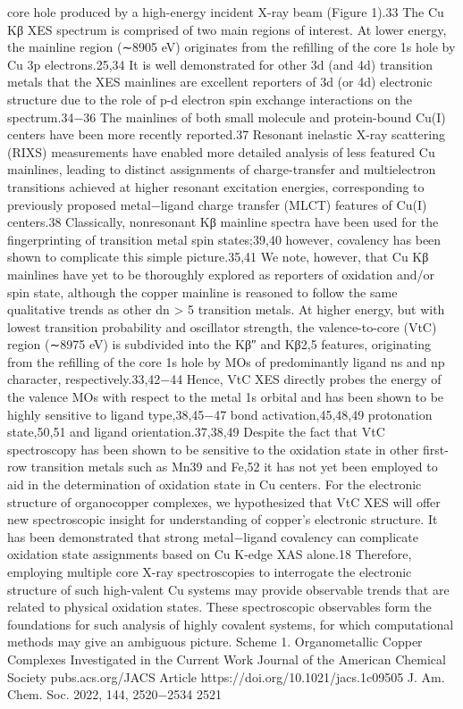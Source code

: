 \documentclass{article}
\begin{document}
core hole produced by a high-energy incident X-ray beam
(Figure 1).33 The Cu Kβ XES spectrum is comprised of two
main regions of interest. At lower energy, the mainline region
(∼8905 eV) originates from the reﬁlling of the core 1s hole by
Cu 3p electrons.25,34 It is well demonstrated for other 3d (and
4d) transition metals that the XES mainlines are excellent
reporters of 3d (or 4d) electronic structure due to the role of
p-d electron spin exchange interactions on the spectrum.34−36
The mainlines of both small molecule and protein-bound
Cu(I) centers have been more recently reported.37 Resonant
inelastic X-ray scattering (RIXS) measurements have enabled
more detailed analysis of less featured Cu mainlines, leading to
distinct assignments of charge-transfer and multielectron
transitions achieved at higher resonant excitation energies,
corresponding to previously proposed metal−ligand charge
transfer (MLCT) features of Cu(I) centers.38 Classically,
nonresonant Kβ mainline spectra have been used for the
ﬁngerprinting of transition metal spin states;39,40 however,
covalency has been shown to complicate this simple
picture.35,41 We note, however, that Cu Kβ mainlines have
yet to be thoroughly explored as reporters of oxidation and/or
spin state, although the copper mainline is reasoned to follow
the same qualitative trends as other dn > 5 transition metals.
At higher energy, but with lowest transition probability and
oscillator strength, the valence-to-core (VtC) region (∼8975
eV) is subdivided into the Kβ″ and Kβ2,5 features, originating
from the reﬁlling of the core 1s hole by MOs of predominantly
ligand ns and np character, respectively.33,42−44 Hence, VtC
XES directly probes the energy of the valence MOs with
respect to the metal 1s orbital and has been shown to be highly
sensitive to ligand type,38,45−47 bond activation,45,48,49
protonation state,50,51 and ligand orientation.37,38,49 Despite
the fact that VtC spectroscopy has been shown to be sensitive
to the oxidation state in other ﬁrst-row transition metals such
as Mn39 and Fe,52 it has not yet been employed to aid in the
determination of oxidation state in Cu centers.
For the electronic structure of organocopper complexes, we
hypothesized that VtC XES will oﬀer new spectroscopic insight
for understanding of copper’s electronic structure. It has been
demonstrated that strong metal−ligand covalency can
complicate oxidation state assignments based on Cu K-edge
XAS alone.18 Therefore, employing multiple core X-ray
spectroscopies to interrogate the electronic structure of such
high-valent Cu systems may provide observable trends that are
related to physical oxidation states. These spectroscopic
observables form the foundations for such analysis of highly
covalent systems, for which computational methods may give
an ambiguous picture.
Scheme 1. Organometallic Copper Complexes Investigated
in the Current Work
Journal of the American Chemical Society
pubs.acs.org/JACS
Article
https://doi.org/10.1021/jacs.1c09505
J. Am. Chem. Soc. 2022, 144, 2520−2534
2521
\end{document}
